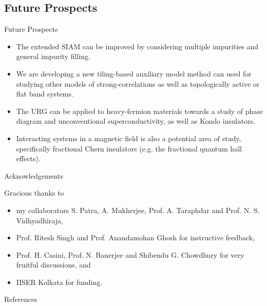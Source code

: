 \documentclass[8pt,aspectratio=169]{beamer}
\newcommand{\nitem}{\item[\ding{51}]}
\begin{document}
\begin{frame}{}
\section{Future Prospects}
\end{frame}

\begin{frame}{Future Prospects}
\begin{itemize}
	\nitem The extended SIAM can be improved by considering \alert{multiple impurities} and general impurity \alert{filling}.\\[20pt]
	\nitem We are developing a new \alert{tiling-based auxiliary model method} can used for studying other models of strong-correlations as well as topologically active or flat band systems.\\[20pt]
	\nitem The URG can be applied to \alert{heavy-fermion materials} towards a study of phase diagram and unconventional superconductivity, as well as Kondo insulators.\\[20pt]
	\nitem Interacting systems in a magnetic field is also a potential area of study, specifically \alert{fractional Chern insulators} (e.g. the fractional quantum hall effects).
\end{itemize}
\end{frame}


\begin{frame}{Acknowledgements}

\flushleft
Gracious thanks to\\[10pt]
\begin{itemize}
	\nitem my collaborators \alert{S. Patra, A. Mukherjee, Prof. A. Taraphdar} and \alert{Prof. N. S. Vidhyadhiraja},\\[10pt]
	\nitem \alert{Prof. Ritesh Singh} and \alert{Prof. Anandamohan Ghosh} for instructive feedback,\\[10pt]
	\nitem \alert{Prof. H. Casini, Prof. N. Banerjee} and \alert{Shibendu G. Chowdhury} for very fruitful discussions, and\\[10pt]
	\nitem IISER Kolkata for funding.
\end{itemize}

\end{frame}

\appendix

\begin{frame}[allowframebreaks]{References}
\printbibliography[heading=none]
\end{frame}
\end{document}
